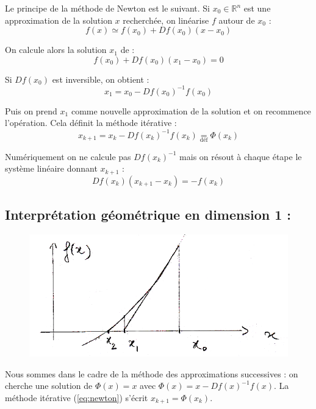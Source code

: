 \documentclass[a4paper,11pt]{article}
\newcommand{\R}{\mathbb{R}}
\theoremstyle{plain} %
\begin{document}
    Le principe de la méthode de Newton est le suivant. Si $x_0 \in \R^n$ est une approximation de la solution $x$ recherchée,
    on linéarise $f$ autour de $x_0$ :
    \[
        f(x) \simeq f(x_0) + Df(x_0)(x-x_0)
    \]

    On calcule alors la solution $x_1$ de :
    \[
        f(x_0) + Df(x_0)(x_1 - x_0) = 0 
    \]

    Si $Df(x_0)$ est inversible, on obtient :
    \[
        x_1 = x_0 - Df(x_0)^{-1}f(x_0)
    \]

    Puis on prend $x_1$ comme nouvelle approximation de la solution et on recommence
    l'opération. Cela définit la méthode itérative :
    \begin{equation}
        x_{k+1} = x_k - Df(x_k)^{-1}f(x_k) \underset{\text{déf}}{=} \Phi(x_k)
        \label{eq:newton}
    \end{equation}

    \begin{remark}
        Numériquement on ne calcule pas $Df(x_k)^{-1}$ mais on résout à chaque étape le
        système linéaire donnant $x_{k+1}$ :
        \[
            Df(x_k)(x_{k+1} - x_k) = -f(x_k)
        \]
    \end{remark}

    \subsection*{Interprétation géométrique en dimension 1 :}

    \begin{figure}[h]
        \centering
        \includegraphics[scale=0.5]{newton-dim1.png}
    \end{figure}

    Nous sommes dans le cadre de la méthode des approximations successives :
    on cherche une solution de $\Phi(x) = x$ avec $\Phi(x) = x - Df(x)^{-1}f(x)$.
    La méthode itérative (\ref{eq:newton}) s'écrit $x_{k+1} = \Phi(x_k)$.
\end{document}
